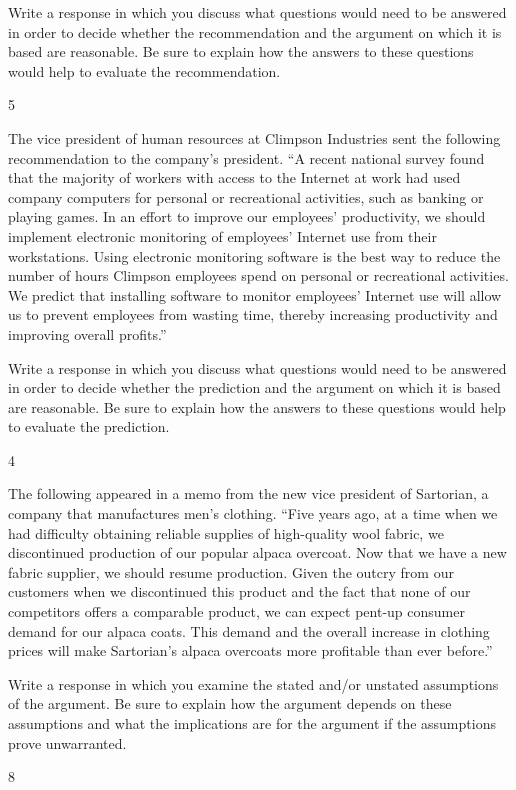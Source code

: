 \documentclass[]{article}
\begin{document}
Write a response in which you discuss what questions would need to be
answered in order to decide whether the recommendation and the argument
on which it is based are reasonable. Be sure to explain how the answers
to these questions would help to evaluate the recommendation.

5

The vice president of human resources at Climpson Industries sent the
following recommendation to the company's president. ``A recent national
survey found that the majority of workers with access to the Internet at
work had used company computers for personal or recreational activities,
such as banking or playing games. In an effort to improve our employees'
productivity, we should implement electronic monitoring of employees'
Internet use from their workstations. Using electronic monitoring
software is the best way to reduce the number of hours Climpson
employees spend on personal or recreational activities. We predict that
installing software to monitor employees' Internet use will allow us to
prevent employees from wasting time, thereby increasing productivity and
improving overall profits.''

Write a response in which you discuss what questions would need to be
answered in order to decide whether the prediction and the argument on
which it is based are reasonable. Be sure to explain how the answers to
these questions would help to evaluate the prediction.

4

The following appeared in a memo from the new vice president of
Sartorian, a company that manufactures men's clothing. ``Five years ago,
at a time when we had difficulty obtaining reliable supplies of
high-quality wool fabric, we discontinued production of our popular
alpaca overcoat. Now that we have a new fabric supplier, we should
resume production. Given the outcry from our customers when we
discontinued this product and the fact that none of our competitors
offers a comparable product, we can expect pent-up consumer demand for
our alpaca coats. This demand and the overall increase in clothing
prices will make Sartorian's alpaca overcoats more profitable than ever
before.''

Write a response in which you examine the stated and/or unstated
assumptions of the argument. Be sure to explain how the argument depends
on these assumptions and what the implications are for the argument if
the assumptions prove unwarranted.

8
\end{document}
